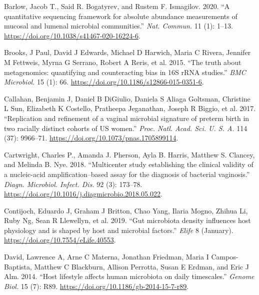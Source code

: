 \documentclass[
]{article}
\newlength{\cslhangindent}
\newlength{\cslentryspacingunit} %
\newenvironment{CSLReferences}[2] %
 {%
  \setlength{\parindent}{0pt}
  \ifodd #1
  \let\oldpar\par
  \def\par{\hangindent=\cslhangindent\oldpar}
  \fi
  \setlength{\parskip}{#2\cslentryspacingunit}
 }%
 {}
\begin{document}
\hypertarget{refs}{}
\begin{CSLReferences}{1}{0}
\leavevmode{}%
Barlow, Jacob T., Said R. Bogatyrev, and Rustem F. Ismagilov. 2020. {``{A quantitative sequencing framework for absolute abundance measurements of mucosal and lumenal microbial communities}.''} \emph{Nat. Commun.} 11 (1): 1--13. \url{https://doi.org/10.1038/s41467-020-16224-6}.

\leavevmode{}%
Brooks, J Paul, David J Edwards, Michael D Harwich, Maria C Rivera, Jennifer M Fettweis, Myrna G Serrano, Robert A Reris, et al. 2015. {``{The truth about metagenomics: quantifying and counteracting bias in 16S rRNA studies}.''} \emph{BMC Microbiol.} 15 (1): 66. \url{https://doi.org/10.1186/s12866-015-0351-6}.

\leavevmode{}%
Callahan, Benjamin J, Daniel B DiGiulio, Daniela S Aliaga Goltsman, Christine L Sun, Elizabeth K Costello, Pratheepa Jeganathan, Joseph R Biggio, et al. 2017. {``{Replication and refinement of a vaginal microbial signature of preterm birth in two racially distinct cohorts of US women}.''} \emph{Proc. Natl. Acad. Sci. U. S. A.} 114 (37): 9966--71. \url{https://doi.org/10.1073/pnas.1705899114}.

\leavevmode{}%
Cartwright, Charles P., Amanda J. Pherson, Ayla B. Harris, Matthew S. Clancey, and Melinda B. Nye. 2018. {``{Multicenter study establishing the clinical validity of a nucleic-acid amplification--based assay for the diagnosis of bacterial vaginosis}.''} \emph{Diagn. Microbiol. Infect. Dis.} 92 (3): 173--78. \url{https://doi.org/10.1016/j.diagmicrobio.2018.05.022}.

\leavevmode{}%
Contijoch, Eduardo J, Graham J Britton, Chao Yang, Ilaria Mogno, Zhihua Li, Ruby Ng, Sean R Llewellyn, et al. 2019. {``{Gut microbiota density influences host physiology and is shaped by host and microbial factors}.''} \emph{Elife} 8 (January). \url{https://doi.org/10.7554/eLife.40553}.

\leavevmode{}%
David, Lawrence A, Arne C Materna, Jonathan Friedman, Maria I Campos-Baptista, Matthew C Blackburn, Allison Perrotta, Susan E Erdman, and Eric J Alm. 2014. {``{Host lifestyle affects human microbiota on daily timescales}.''} \emph{Genome Biol.} 15 (7): R89. \url{https://doi.org/10.1186/gb-2014-15-7-r89}.


\end{CSLReferences}
\end{document}
